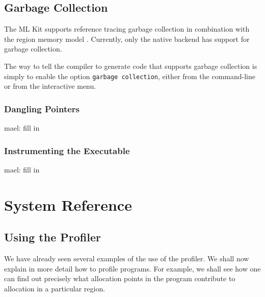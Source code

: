 \documentclass[12pt]{book}
\begin{document}
\chapter{Garbage Collection}
\label{gc.chap}
The ML Kit supports reference tracing garbage collection in
combination with the region memory model \cite{hallenberg99}.
Currently, only the native backend has support for garbage collection.

The way to tell the compiler to generate code that supports garbage
collection is simply to enable the option {\tt garbage collection},
either from the command-line or from the interactive menu.

\section{Dangling Pointers}
mael: fill in
\section{Instrumenting the Executable}
mael: fill in


\part{System Reference}

\chapter{Using the Profiler}
\label{useOfProf.sec}
We have already seen several examples of the use of the profiler. We
shall now explain in more detail how to profile programs. For example, we shall see
how one can find out precisely what allocation points in the program
contribute to allocation in a particular region.
\end{document}
